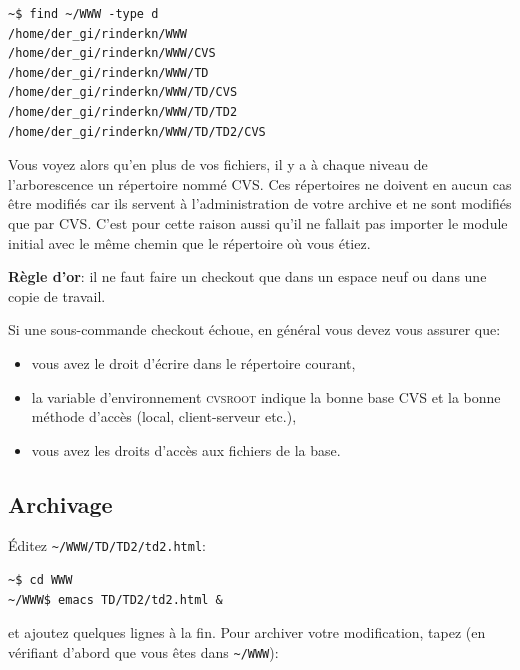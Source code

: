 \documentclass[11pt,a4paper]{article}
\begin{document}
{\small
\begin{verbatim}
~$ find ~/WWW -type d
/home/der_gi/rinderkn/WWW
/home/der_gi/rinderkn/WWW/CVS
/home/der_gi/rinderkn/WWW/TD
/home/der_gi/rinderkn/WWW/TD/CVS
/home/der_gi/rinderkn/WWW/TD/TD2
/home/der_gi/rinderkn/WWW/TD/TD2/CVS
\end{verbatim}
}

\noindent
Vous voyez alors qu'en plus de vos fichiers, il y a à chaque niveau de
l'arborescence un répertoire nommé CVS. Ces répertoires ne doivent en
aucun cas être modifiés car ils servent à l'administration de votre
archive et ne sont modifiés que par CVS. C'est pour cette raison aussi
qu'il ne fallait pas importer le module initial avec le même chemin
que le répertoire où vous étiez.

\bigskip

\noindent
\textbf{Règle d'or}: il ne faut faire un \textsf{checkout} que dans un
espace neuf ou dans une copie de travail.

\bigskip

\noindent Si une sous-commande \textsf{checkout} échoue, en général
vous devez vous assurer que:

\begin{itemize}

  \item vous avez le droit d'écrire dans le répertoire courant,

  \item la variable d'environnement \textsc{cvsroot} indique la bonne
   base CVS et la bonne méthode d'accès (local, client-serveur etc.),

  \item vous avez les droits d'accès aux fichiers de la base.

\end{itemize}


\subsection{Archivage}

\noindent Éditez \verb|~/WWW/TD/TD2/td2.html|:

{\small
\begin{verbatim}
~$ cd WWW
~/WWW$ emacs TD/TD2/td2.html &
\end{verbatim}
}

\noindent
et ajoutez quelques lignes à la fin. Pour archiver votre modification,
tapez (en vérifiant d'abord que vous êtes dans \verb|~/WWW|):
\end{document}
